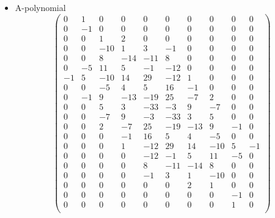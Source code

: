 \documentclass[12pt,reqno]{amsart}
\numberwithin{equation}{section}
\begin{document}
\begin{itemize}
\item A-polynomial
  \begin{equation*}
    \begin{pmatrix}
      0 & 1 & 0 & 0 & 0 & 0 & 0 & 0 & 0 &  0 \\
      0 &      -1 & 0 & 0 & 0 & 0 & 0 & 0 & 0 &  0 \\
      0 &      0 & 1 & 2 & 0 & 0 & 0 & 0 & 0 &  0 \\
      0 &      0 & -10 & 1 & 3 & -1 & 0 & 0 & 0 &  0 \\
      0 &      0 & 8 & -14 & -11 & 8 & 0 & 0 & 0 &  0 \\
      0 &      -5 & 11 & 5 & -1 & -12 & 0 & 0 & 0 &  0 \\
      -1 &      5 & -10 & 14 & 29 & -12 & 1 & 0 & 0 &  0 \\
      0 &      0 & -5 & 4 & 5 & 16 & -1 & 0 & 0 &  0 \\
      0 &      -1  & 9 & -13 & -19 & 25 & -7 & 2 & 0 &  0 \\
      0 &      0 & 5 & 3 & -33 & -3 & 9 & -7 & 0 &  0 \\
      0 &      0 & -7 & 9 & -3 & -33 & 3 & 5 & 0 &  0 \\
      0 &      0 & 2 & -7 & 25 & -19 & -13 & 9 & -1 &  0 \\
      0 &      0 & 0 & -1 & 16 & 5 & 4 & -5 & 0 &  0 \\
      0 &      0 & 0 & 1 & -12 & 29 & 14 & -10 & 5 &  -1 \\
      0 &      0 & 0 & 0 & -12 & -1 & 5 & 11 & -5 &  0 \\
      0 &      0 & 0 & 0 & 8 & -11 & -14 & 8 & 0 &  0 \\
      0 &      0 & 0 & 0 & -1 & 3 & 1 & -10 & 0 &  0 \\
      0 &      0 & 0 & 0 & 0 & 0 & 2 & 1 & 0 &  0 \\
      0 &      0 & 0 & 0 & 0 & 0 & 0 & 0 & -1 &  0 \\
      0 &      0 & 0 & 0 & 0 & 0 & 0 & 0 & 1 &  0 \\
    \end{pmatrix}
  \end{equation*}
\end{itemize}
\end{document}
